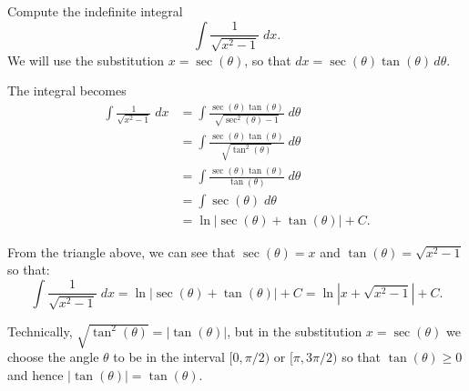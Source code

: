 \documentclass{ximera}
\begin{document}
\begin{example}
Compute the indefinite integral
\[
\int \frac{1}{\sqrt{x^2-1}} \; dx.
\]
We will use the substitution $x = \sec(\theta)$,
so that $dx = \sec(\theta)\tan(\theta) \, d\theta$.

The integral becomes
\begin{align*}
\int \frac{1}{\sqrt{x^2-1}}\; dx &= \int \frac{\sec(\theta)\tan(\theta)}{\sqrt{\sec^2(\theta)-1}}\; d\theta\\
                                 &= \int \frac{\sec(\theta)\tan(\theta)}{\sqrt{\tan^2(\theta)}}\; d\theta\\
                                 &= \int \frac{\sec(\theta)\tan(\theta)}{\tan(\theta)}\; d\theta\\
                                  &= \int \sec(\theta)\; d\theta\\
                                  &= \ln|\sec(\theta)+ \tan(\theta)| + C.
\end{align*}


From the triangle above, we can see that $\sec(\theta) = x$ and $\tan(\theta) = \sqrt{x^2-1}$ so that:
\[
\int \frac{1}{\sqrt{x^2-1}} \; dx = \ln|\sec(\theta)+ \tan(\theta)| + C = \ln|x+\sqrt{x^2-1}| + C.
\]

\end{example}

\begin{remark}
Technically, $\sqrt{\tan^2(\theta)} = |\tan(\theta)|$, but in the substitution $x = \sec(\theta)$ we 
choose the angle $\theta$ to be in the interval 
$[0, \pi/2)$ or $[\pi, 3\pi/2)$ so that $\tan(\theta) \geq 0$ and hence $|\tan(\theta)| = \tan(\theta)$.
\end{remark}
\end{document}
